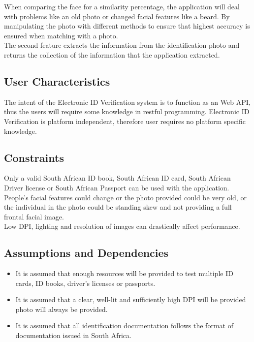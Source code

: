 \documentclass{article}
\def \project{Electronic ID Verification }
\begin{document}
		  \noindent When comparing the face for a similarity percentage, the application will deal with problems like an old photo or changed facial features like a beard. By manipulating the photo with different methods to ensure that highest accuracy is ensured when matching with a photo.\\
		  
		  \noindent The second feature extracts the information from the identification photo and returns the collection of the information that the application extracted.

		\subsection{User Characteristics}\label{subsec:overall-user-characteristics}
		    The intent of the \project system is to function as an Web API, thus the users will require some knowledge in restful programming. \project is platform independent, therefore user requires no platform specific knowledge.

		\subsection{Constraints}\label{subsec:overall-constraints}
			Only a valid South African ID book, South African ID card, South African Driver license or South African Passport can be used with the application.\\
			
			\noindent People's facial features could change or the photo provided could be very old, or the individual in the photo could be standing skew and not providing a full frontal facial image.\\

			\noindent Low DPI, lighting and resolution of images can drastically    affect performance.

		\subsection{Assumptions and Dependencies}\label{subsec:overall-asusmptions-and-dependencies}
		\begin{itemize}
		    \item It is assumed that enough resources will be provided to test multiple ID cards, ID books, driver's licenses or passports.
		    \item It is assumed that a clear, well-lit and sufficiently high DPI will be provided photo will always be provided.
		    \item It is assumed that all identification documentation follows the format of documentation issued in South Africa.
		\end{itemize}
			
\end{document}
